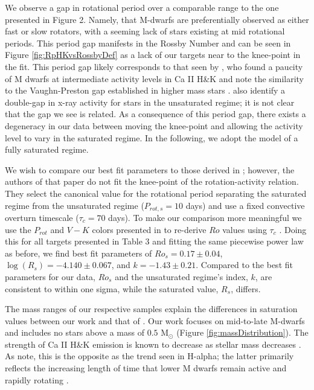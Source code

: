 We observe a gap in rotational period over a comparable range to the
one presented in \citet{Newton2016} Figure 2. Namely, that M-dwarfs are
preferentially observed as either fast or slow rotators, with a seeming lack of
stars existing at mid rotational periods. This period gap manifests in the
Rossby Number and can be seen in Figure \ref{fig:RpHKvsRossbyDef} as a lack of
our targets near to the knee-point in the fit. This period gap likely
corresponds to that seen by \citet{Browning2010}, who found a paucity of M
dwarfs at intermediate activity levels in Ca II H\&K and note the similarity to
the Vaughn-Preston gap established in higher mass stars \citep{vaughan1980}.
\citet{Magaudda2020} also identify a double-gap in x-ray activity for stars in
the unsaturated regime; it is not clear that the gap we see is related. As a
consequence of this period gap, there exists a degeneracy in our data
between moving the knee-point and allowing the activity level to vary in the
saturated regime.  In the following, we adopt the model of a fully saturated
regime.

We wish to compare our best fit parameters to those derived in \citet{Def17};
however, the authors of that paper do not fit the knee-point of the
rotation-activity relation. They select the canonical value for the rotational
period separating the saturated regime from the unsaturated regime ($P_{rot,s}
= 10$ days) and use a fixed convective overturn timescale ($\tau_{c} = 70$
days). To make our comparison more meaningful we use the $P_{rot}$ and $V-K$
colors presented in \citet{Def17} to re-derive $Ro$ values using $\tau_{c}$
\citep{Wri18}. Doing this for all targets presented in \citet{Def17} Table 3
and fitting the same piecewise power law as before, we find best fit parameters
of $Ro_{s} = 0.17\pm0.04$, $\log(R_{s}) = -4.140\pm0.067$, and
$k=-1.43\pm0.21$. Compared to the best fit parameters for our data, $Ro_{s}$
and the unsaturated regime's index, $k$, are consistent to within one sigma,
while the saturated value, $R_{s}$, differs. 

The mass ranges of our respective samples explain the differences in saturation
values between our work and that of \citet{Def17}. Our work focuses on
mid-to-late M-dwarfs and includes no stars above a mass of $0.5$ M$_{\odot}$
(Figure \ref{fig:massDistribution}).  The strength of Ca II H\&K
emission is known to decrease as stellar mass decreases \citep{Schrijver1987,
Rauscher2006, Hou17}. As \citet{Rauscher2006} note, this is the opposite as the
trend seen in H-alpha; the latter primarily reflects the increasing length of
time that lower M dwarfs remain active and rapidly rotating \citep{West2015,
Newton2016}.

